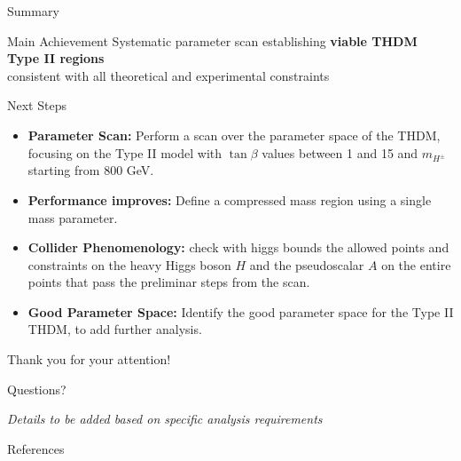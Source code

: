 \documentclass{../bredelebeamer}
\begin{document}
\begin{frame}{Summary}
    \begin{exampleblock}{Main Achievement}
        \centering
        Systematic parameter scan establishing \textbf{viable THDM Type II regions} \\
        consistent with all theoretical and experimental constraints
    \end{exampleblock}
\end{frame}

\begin{frame}{Next Steps}
    \begin{itemize}
        \item \textbf{Parameter Scan:} Perform a scan over the parameter space of the THDM, focusing on the Type II model with $\tan\beta$ values between 1 and 15 and $m_{H^\pm}$ starting from 800 GeV.\vfill
        \item \textbf{Performance improves:} Define a compressed mass region using a single mass parameter. \vfill
        \item \textbf{Collider Phenomenology:} check with higgs bounds the allowed points and constraints on the heavy Higgs boson $H$ and the pseudoscalar $A$ on the entire points that pass the preliminar steps from the scan. \vfill
        \item \textbf{Good Parameter Space:} Identify the good parameter space for the Type II THDM, to add further analysis.
    \end{itemize}
\end{frame}
\begin{frame}
    \begin{center}
        {\Huge Thank you for your attention!}
        
        \vfill
        
        {\Large Questions?}
        
        \vfill
        
        \textit{Details to be added based on specific analysis requirements}
    \end{center}
\end{frame}

\begin{frame}[allowframebreaks]{References}
    \printbibliography%
\end{frame}
\end{document}
